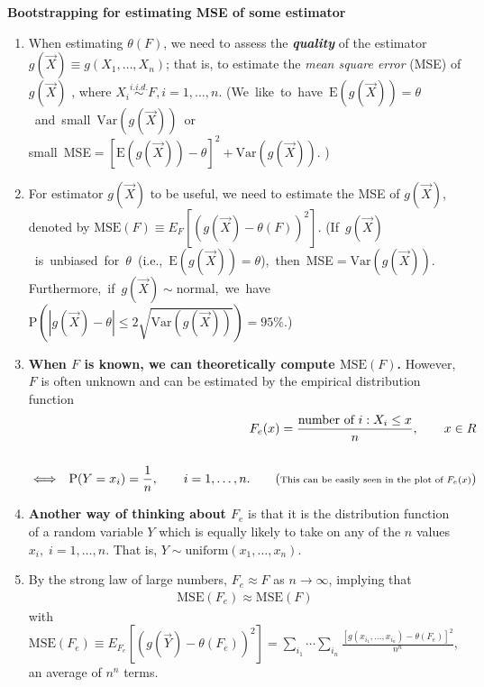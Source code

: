 \documentclass[12pt]{article}
\begin{document}
\centerline{\Large\bf Bootstrapping for estimating MSE of some
estimator}
\begin{enumerate}
\item When estimating $\theta(F)$, we need  to assess the {\bf\em quality} of the estimator $g({\vec X})\equiv
g(X_1,\ldots,X_n)$; that is, to estimate the {\em mean square error}
(MSE) of $g({\vec X})$ , where $X_i\stackrel{i.i.d.}{\sim} F,
i=1,\ldots,n$. \bigg(\mbox{\scriptsize We like to have
$\mbox{E}(g({\vec X}))=\theta$ and small $\mbox{Var}(g({\vec X}))$
or}\\
\mbox{\scriptsize small MSE$=\left[\mbox{E}(g({\vec X}))-\theta
\right]^2+\mbox{Var}(g({\vec X}))$.} \bigg)

\item For estimator
$g({\vec X})$ to be useful, we need to estimate   the MSE of
$g({\vec X})$, denoted by $\mbox{MSE$(F)$}\equiv E_F\!\!\left[
(g({\vec X})-\theta(F))^2\right]$. \bigg(\mbox{\scriptsize If
$g({\vec X})$ is unbiased for $\theta$ (i.e., $\mbox{E}(g({\vec
X}))=\theta$), then MSE$=\mbox{Var}(g({\vec X}))$.}\\
\mbox{\scriptsize Furthermore, if $g({\vec X})\sim \mbox{normal}$,
we have $\mbox{P}\!\!\left(\left|g({\vec X})-\theta\right|\le
2\sqrt{\mbox{Var}(g({\vec X}))}\right)=95\%$.}\bigg)

\item {\bf When $F$ is known, we can theoretically compute
$\mbox{MSE$(F)$}$.}  However, $F$ is often unknown and can be
estimated by the empirical distribution function
\begin{eqnarray*}
   && F_e(x)  =\frac{\mbox{number of $i: X_i\le x$}}{n}, \qquad x\in R\\\\
   &\Longleftrightarrow & \mbox{P}(Y=x_i)=\frac{1}{n},\qquad
   i=1,\ldots,n.\qquad(\mbox{\scriptsize This can be easily seen in the plot of $F_e(x)$})
\end{eqnarray*}

\item {\bf Another way of thinking about $F_e$} is that it is the
distribution function of a random variable $Y$ which is equally
likely to take on any of the $n$ values \linebreak $x_i, \; i=1,
\ldots, n$. That is, $Y\sim \mbox{uniform}(x_1,\ldots,x_n)$.

\item By the strong law of large numbers, $F_e\approx F$ as $n
\longrightarrow \infty$, implying that
\begin{eqnarray*}
\mbox{MSE$(F_e)$}\approx
 \mbox{MSE$(F)$}
\end{eqnarray*}
with $\mbox{MSE$(F_e)$}\equiv E_{F_e}\!\!\left[ (g({\vec
Y})-\theta(F_e))^2\right]=
\sum_{i_1}\cdots\sum_{i_n}\frac{[g(x_{i_1},\ldots,x_{i_n})-\theta(F_e)]^2}{n^n}$,
an average of $n^n$ terms.



\end{enumerate}
\end{document}
